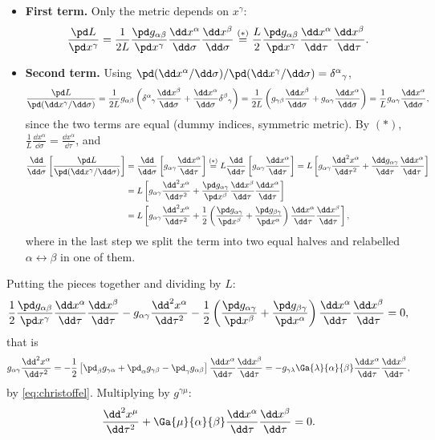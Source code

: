 \begin{itemize}
\item \textbf{First term.} Only the metric depends on $x^\gamma$:
\[
  \frac{\pd L}{\pd x^\gamma}=\frac{1}{2L}\frac{\pd g_{\alpha\beta}}{\pd x^\gamma}\frac{\dd x^\alpha}{\dd\sigma}\frac{\dd x^\beta}{\dd\sigma}
  \overset{(\ast)}{=}\frac{L}{2}\frac{\pd g_{\alpha\beta}}{\pd x^\gamma}\frac{\dd x^\alpha}{\dd\tau}\frac{\dd x^\beta}{\dd\tau}.
\]
\item \textbf{Second term.} Using $\pd(\dd x^\alpha/\dd\sigma)/\pd(\dd x^\gamma/\dd\sigma)=\delta^\alpha{}_\gamma$,
\[
  \frac{\pd L}{\pd(\dd x^\gamma/\dd\sigma)}=\frac{1}{2L}g_{\alpha\beta}\left(\delta^\alpha{}_\gamma\frac{\dd x^\beta}{\dd\sigma}+\frac{\dd x^\alpha}{\dd\sigma}\delta^\beta{}_\gamma\right)
  =\frac{1}{2L}\left(g_{\gamma\beta}\frac{\dd x^\beta}{\dd\sigma}+g_{\alpha\gamma}\frac{\dd x^\alpha}{\dd\sigma}\right)=\frac1L g_{\alpha\gamma}\frac{\dd x^\alpha}{\dd\sigma},
\]
since the two terms are equal (dummy indices, symmetric metric). By $(\ast)$, $\frac1L\frac{\dd x^\alpha}{\dd\sigma}=\frac{\dd x^\alpha}{\dd\tau}$, and
\begin{align*}
  \frac{\dd}{\dd\sigma}\left[\frac{\pd L}{\pd(\dd x^\gamma/\dd\sigma)}\right]
  &=\frac{\dd}{\dd\sigma}\left[g_{\alpha\gamma}\frac{\dd x^\alpha}{\dd\tau}\right]\overset{(\ast)}{=}L\frac{\dd}{\dd\tau}\left[g_{\alpha\gamma}\frac{\dd x^\alpha}{\dd\tau}\right]
  =L\left[g_{\alpha\gamma}\frac{\dd^2x^\alpha}{\dd\tau^2}+\frac{\dd g_{\alpha\gamma}}{\dd\tau}\frac{\dd x^\alpha}{\dd\tau}\right]\\
  &=L\left[g_{\alpha\gamma}\frac{\dd^2x^\alpha}{\dd\tau^2}+\frac{\pd g_{\alpha\gamma}}{\pd x^\beta}\frac{\dd x^\beta}{\dd\tau}\frac{\dd x^\alpha}{\dd\tau}\right]\\
  &=L\left[g_{\alpha\gamma}\frac{\dd^2x^\alpha}{\dd\tau^2}+\frac12\left(\frac{\pd g_{\alpha\gamma}}{\pd x^\beta}+\frac{\pd g_{\beta\gamma}}{\pd x^\alpha}\right)\frac{\dd x^\alpha}{\dd\tau}\frac{\dd x^\beta}{\dd\tau}\right],
\end{align*}
where in the last step we split the term into two equal halves and relabelled $\alpha\leftrightarrow\beta$ in one of them.
\end{itemize}
Putting the pieces together and dividing by $L$:
\[
  \frac12\frac{\pd g_{\alpha\beta}}{\pd x^\gamma}\frac{\dd x^\alpha}{\dd\tau}\frac{\dd x^\beta}{\dd\tau}-g_{\alpha\gamma}\frac{\dd^2x^\alpha}{\dd\tau^2}-\frac12\left(\frac{\pd g_{\alpha\gamma}}{\pd x^\beta}+\frac{\pd g_{\beta\gamma}}{\pd x^\alpha}\right)\frac{\dd x^\alpha}{\dd\tau}\frac{\dd x^\beta}{\dd\tau}=0,
\]
that is
\[
  g_{\alpha\gamma}\frac{\dd^2x^\alpha}{\dd\tau^2}=-\frac12\left[\pd_\beta g_{\gamma\alpha}+\pd_\alpha g_{\gamma\beta}-\pd_\gamma g_{\alpha\beta}\right]\frac{\dd x^\alpha}{\dd\tau}\frac{\dd x^\beta}{\dd\tau}
  =-g_{\gamma\lambda}\Ga{\lambda}{\alpha}{\beta}\frac{\dd x^\alpha}{\dd\tau}\frac{\dd x^\beta}{\dd\tau},
\]
by \eqref{eq:christoffel}. Multiplying by $g^{\gamma\mu}$:
\begin{equation}
  \frac{\dd^2x^\mu}{\dd\tau^2}+\Ga{\mu}{\alpha}{\beta}\frac{\dd x^\alpha}{\dd\tau}\frac{\dd x^\beta}{\dd\tau}=0 .
\end{equation}

